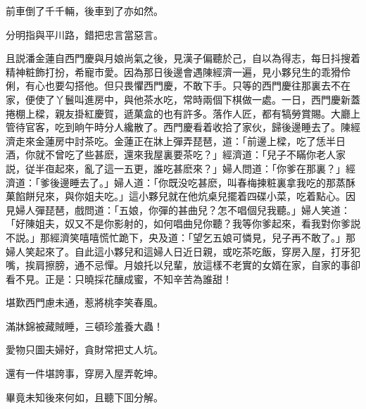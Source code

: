 \begin{myquote}
前車倒了千千輛，後車到了亦如然。

分明指與平川路，錯把忠言當惡言。
\end{myquote}

且説潘金蓮自西門慶與月娘尚氣之後，見漢子偏聽於己，自以為得志，每日抖搜着精神粧飾打扮，希寵巿愛。因為那日後邊會遇陳經濟一遍，見小夥兒生的乖猾伶俐，有心也要勾搭他。但只畏懼西門慶，不敢下手。只等的西門慶往那裏去不在家，便使了丫鬟叫進房中，與他茶水吃，常時兩個下棋做一處。一日，西門慶新蓋捲棚上樑，親友掛紅慶賀，遞菓盒的也有許多。落作人匠，都有犒勞賞賜。大廳上管待官客，吃到晌午時分人纔散了。西門慶看着收拾了家伙，歸後邊睡去了。陳經濟走來金蓮房中討茶吃。金蓮正在牀上彈弄琵琶，道：「前邊上樑，吃了恁半日酒，你就不曾吃了些甚麽，還來我屋裏要茶吃？」經濟道：「兒子不瞞你老人家説，従半亱起來，亂了這一五更，誰吃甚麽來？」婦人問道：「你爹在那裏？」經濟道：「爹後邊睡去了。」婦人道：「你既没吃甚麽，叫春梅揀粧裏拿我吃的那蒸酥菓餡餅兒來，與你姐夫吃。」這小夥兒就在他炕桌兒擺着四碟小菜，吃着點心。因見婦人彈琵琶，戲問道：「五娘，你彈的甚曲兒？怎不唱個兒我聽。」婦人笑道：「好陳姐夫，奴又不是你影射的，如何唱曲兒你聽？我等你爹起來，看我對你爹説不説。」那經濟笑嘻嘻慌忙跪下，央及道：「望乞五娘可憐見，兒子再不敢了。」那婦人笑起來了。自此這小夥兒和這婦人日近日親，或吃茶吃飯，穿房入屋，打牙犯嘴，挨肩擦膀，通不忌憚。月娘托以兒輩，放這樣不老實的女婿在家，自家的事卻看不見。正是：只曉採花釀成蜜，不知辛苦為誰甜！

\begin{myquote}
堪歎西門慮未通，惹將桃李笑春風。

滿牀錦被藏賊睡，三頓珍羞養大蟲！

愛物只圖夫婦好，貪財常把丈人坑。

還有一件堪誇事，穿房入屋弄乾坤。
\end{myquote}

畢竟未知後來何如，且聽下囬分解。

